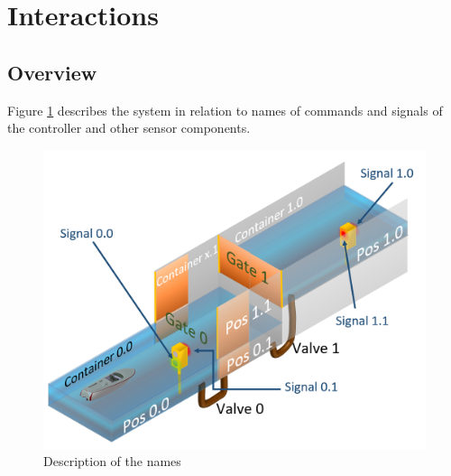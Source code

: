 \section{Interactions}

\subsection{Overview}

Figure \ref{fig:boat1} describes the system in relation to names of commands and signals of the controller and other sensor components.

\begin{figure}[!h]
	\includegraphics[width=\linewidth]{PictureName10}
	\caption{Description of the names}
	\label{fig:boat1}
\end{figure}
\pagebreak


